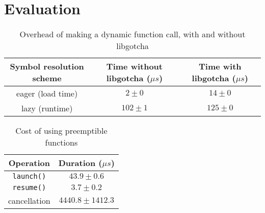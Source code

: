 \section{Evaluation}

\begin{table*}
\begin{center}
\begin{tabular}{c | c c}
Symbol resolution scheme & Time without libgotcha ($\mu{s}$) & Time with libgotcha ($\mu{s}$) \\
\hline
eager (load time) & $2 \pm 0$ & $14 \pm 0$ \\
lazy (runtime) & $102 \pm 1$ & $125 \pm 0$
\end{tabular}
\end{center}
\caption{Overhead of making a dynamic function call, with and without libgotcha}
\end{table*}


\begin{table}
\begin{center}
\begin{tabular}{c | c}
Operation & Duration ($\mu{s}$) \\
\hline
\texttt{launch()} & $43.9 \pm 0.6$ \\
\texttt{resume()} & $3.7 \pm 0.2$ \\
cancellation & $4440.8 \pm 1412.3$
\end{tabular}
\end{center}
\caption{Cost of using preemptible functions}
\end{table}
